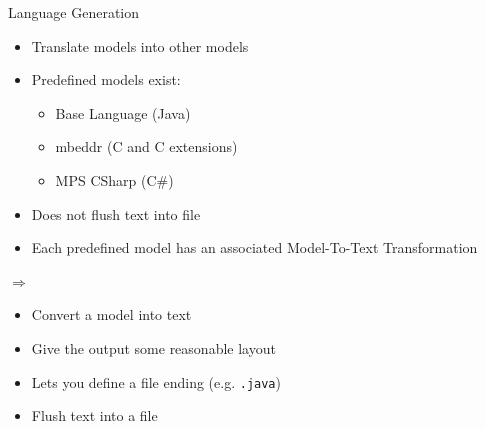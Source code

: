 \begin{frame}{Language Generation}
		\begin{minipage}{0.4\textwidth}
			\begin{itemize}
				\item Translate models into other models
				\item Predefined models exist:
				\begin{itemize}
					\item Base Language (Java)
					\item mbeddr (C and C extensions) \footnotemark[8]
					\item MPS CSharp (C\#) \footnotemark[9]
				\end{itemize}
				\item Does not flush text into file
				\item Each predefined model has an associated Model-To-Text Transformation
			\end{itemize}
		\end{minipage} 
		\pause
		\begin{minipage}{0.09\textwidth}
			\Large
			$\Rightarrow$
		\end{minipage}
		\begin{minipage}{0.4\textwidth}
			\begin{itemize}
				\item Convert a model into text
				\item Give the output some reasonable layout
				\item Lets you define a file ending (e.g. \texttt{.java})
				\item Flush text into a file
			\end{itemize}
		\end{minipage}
	\end{frame}

